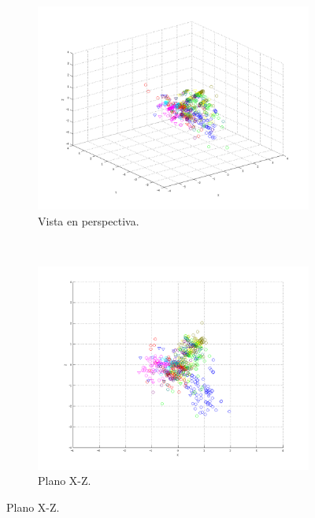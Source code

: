 \documentclass[informe.tex]{subfiles}
\begin{document}
	
	\begin{figure}[H]
        \centering
        \hspace*{-6.5cm}
        \begin{subfigure}[b]{0.49\textwidth}
                \includegraphics[width=\textwidth]{graficos/fold5_criterioParadao_reglas_alpha0_rep1_0P.png}
                \caption{Vista en perspectiva.}
        \end{subfigure}%
        ~
        \begin{subfigure}[b]{0.49\textwidth}
                \includegraphics[width=\textwidth]{graficos/fold5_criterioParadao_reglas_alpha0_rep1_1XZ.png}
                \caption{Plano X-Z.}
        \end{subfigure}
        

\end{figure}
\end{document}
